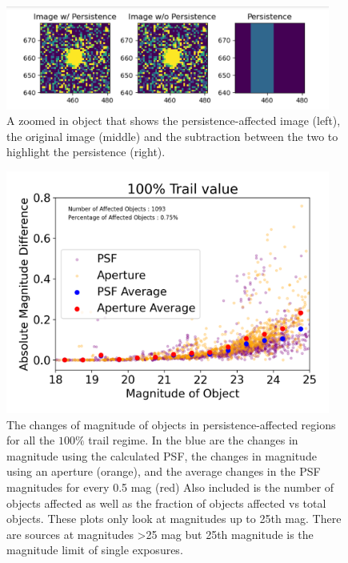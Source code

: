 \documentclass[DM,authoryear,toc]{lsstdoc}
\begin{document}
\begin{figure}[!htp]
  \centering
  \includegraphics[width=0.95\textwidth, angle=0]{Obj_pers.png}
  \caption{
  A zoomed in object that shows the persistence-affected image (left), the original image (middle) 
  and the subtraction between the two to highlight the persistence (right).
  }\label{fig:ex_persistence}
\end{figure}

\begin{figure}[!htp]
  \centering
  \includegraphics[width=0.95\textwidth, angle=0]{Trail_100.png}
  \caption{
  The changes of magnitude of objects in persistence-affected regions for all the $100\%$ trail regime. 
  In the blue are the changes in magnitude using the calculated PSF, the changes in magnitude using an aperture (orange), and the average changes in the PSF magnitudes for every 0.5 mag (red)
  Also included is the number of objects affected as well as the fraction of objects affected vs total objects.
  These plots only look at magnitudes up to 25th mag.
  There are sources at magnitudes >25 mag but 25th magnitude is the magnitude limit of single exposures.
  }\label{fig:affected_objects_100}
\end{figure}
\end{document}
